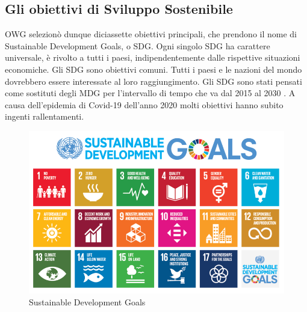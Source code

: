 \subsection{Gli obiettivi di Sviluppo Sostenibile}
\label{sub:sdg}
\noindent OWG selezionò dunque diciassette obiettivi principali, che prendono il nome di Sustainable Development Goals, o SDG.
Ogni singolo SDG ha carattere universale, è rivolto a tutti i paesi, indipendentemente dalle rispettive situazioni economiche.
Gli SDG sono obiettivi comuni. Tutti i paesi e le nazioni del mondo dovrebbero essere interessate al loro raggiungimento.\newline
Gli SDG sono stati pensati come sostituti degli MDG per l'intervallo di tempo che va dal 2015 al 2030 \cite{bureau}.\newline
A causa dell'epidemia di Covid-19 dell'anno 2020 molti obiettivi hanno subito ingenti rallentamenti. 
\begin{figure}[H]
  \includegraphics[width=\linewidth]{img/goals.png}
  \caption{Sustainable Development Goals \cite{sdgImg}}
\end{figure}

